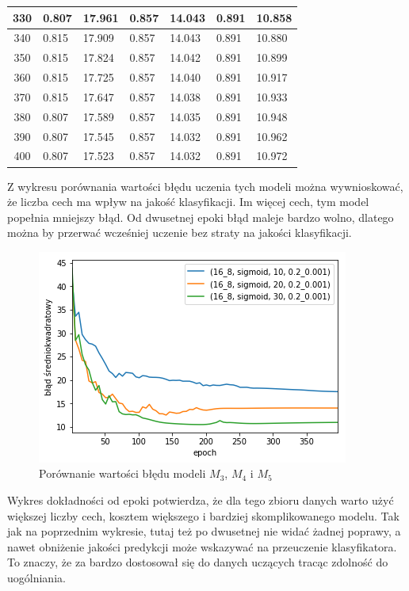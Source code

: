 \documentclass{report}
\begin{document}
\begin{longtable}{|c|l|l|l|l|l|l|}
        330 & 0.807 & 17.961 & 0.857 & 14.043 & 0.891 & 10.858 \\ \hline
        340 & 0.815 & 17.909 & 0.857 & 14.043 & 0.891 & 10.880 \\ \hline
        350 & 0.815 & 17.824 & 0.857 & 14.042 & 0.891 & 10.899 \\ \hline
        360 & 0.815 & 17.725 & 0.857 & 14.040 & 0.891 & 10.917 \\ \hline
        370 & 0.815 & 17.647 & 0.857 & 14.038 & 0.891 & 10.933 \\ \hline
        380 & 0.807 & 17.589 & 0.857 & 14.035 & 0.891 & 10.948 \\ \hline
        390 & 0.807 & 17.545 & 0.857 & 14.032 & 0.891 & 10.962 \\ \hline
        400 & 0.807 & 17.523 & 0.857 & 14.032 & 0.891 & 10.972 \\
    \end{longtable}

    Z wykresu porównania wartości błędu uczenia tych modeli można wywnioskować, że liczba cech ma wpływ na jakość klasyfikacji.
    Im więcej cech, tym model popełnia mniejszy błąd.
    Od dwusetnej epoki błąd maleje bardzo wolno, dlatego można by przerwać wcześniej uczenie bez straty na jakości klasyfikacji.

    \begin{figure}[h]
        \centering
        \includegraphics[scale=0.8]{./img/feat-error.png}
        \caption{Porównanie wartości błędu modeli $M_3$, $M_4$ i $M_5$}
    \end{figure}

    Wykres dokładności od epoki potwierdza, że dla tego zbioru danych warto użyć większej liczby cech, kosztem większego i bardziej skomplikowanego modelu.
    Tak jak na poprzednim wykresie, tutaj też po dwusetnej nie widać żadnej poprawy, a nawet obniżenie jakości predykcji może wskazywać na przeuczenie klasyfikatora.
    To znaczy, że za bardzo dostosował się do danych uczących tracąc zdolność do uogólniania.
\end{document}
